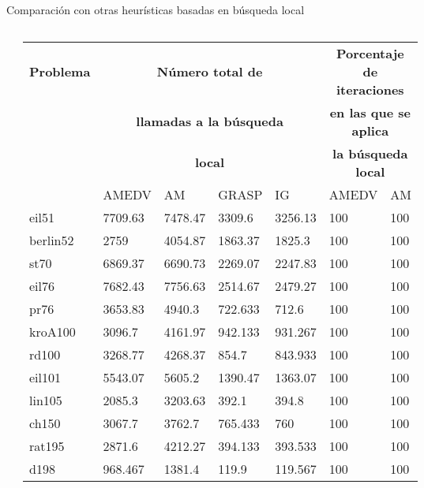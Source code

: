 		\begin{frame}{\fontsize{14}{8}\selectfont Comparación con otras heurísticas basadas en búsqueda local}
			\fontsize{6}{8}\selectfont					
			\kern -5mm
			\begin{columns}[c]
		        \begin{table}[H]
		        	\label{table:ls-llamadas}
		        	\centering
		        	\begin{tabular}{lllllll}
		        		\toprule
		        		\textbf{Problema} & \multicolumn{4}{c}{\color{red}\textbf{Número total de}} & \multicolumn{2}{c}{\color{red}\textbf{Porcentaje de iteraciones}} \\
		        		& \multicolumn{4}{c}{\color{red}\textbf{llamadas a la búsqueda }} & \multicolumn{2}{c}{\color{red}\textbf{en las que se aplica}} \\
		        		& \multicolumn{4}{c}{\color{red}\textbf{local}} & \multicolumn{2}{c}{\color{red}\textbf{la búsqueda local}} \\
		        		\midrule
		        		& AMEDV & AM & GRASP & IG & AMEDV & AM \\
		        		\cmidrule{2-5} \cmidrule{6-7}
		        		eil51    & 7709.63 & 7478.47 & 3309.6 & 3256.13 & 100 & 100    \\
		        		berlin52 & 2759 & 4054.87 & 1863.37 & 1825.3 & 100 & 100    \\
		        		st70     & 6869.37 & 6690.73 & 2269.07 & 2247.83 & 100 & 100    \\
		        		eil76    & 7682.43 & 7756.63 & 2514.67 & 2479.27 & 100 & 100    \\
		        		pr76     & 3653.83 & 4940.3 & 722.633 & 712.6 & 100 & 100    \\
		        		kroA100  & 3096.7 & 4161.97 & 942.133 & 931.267 & 100 & 100    \\
		        		rd100    & 3268.77 & 4268.37 & 854.7 & 843.933 & 100 & 100    \\
		        		eil101   & 5543.07 & 5605.2 & 1390.47 & 1363.07 & 100 & 100    \\
		        		lin105   & 2085.3 & 3203.63 & 392.1 & 394.8 & 100 & 100    \\
		        		ch150    & 3067.7 & 3762.7 & 765.433 & 760 & 100 & 100    \\
		        		rat195   & 2871.6 & 4212.27 & 394.133 & 393.533 & 100 & 100    \\
		        		d198     & 968.467 & 1381.4 & 119.9 & 119.567 & 100 & 100    \\

\end{tabular}
\end{table}
\end{columns}
\end{frame}
